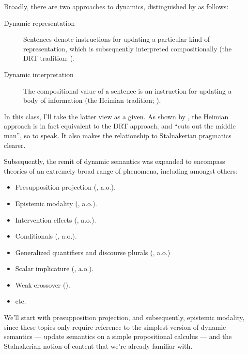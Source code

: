 \documentclass[nols,twoside,nofonts,nobib,nohyper]{tufte-handout}
\theoremstyle{definition}
\begin{document}
Broadly, there are two approaches to dynamics, distinguished by \citet{Yalcin2013} as follows:

\begin{description}

    \item[Dynamic representation] Sentences denote instructions for updating a particular kind of representation, which is subsequently interpreted compositionally (the DRT tradition; \citealt{Kamp1981}).

    \item[Dynamic interpretation] The compositional value of a sentence is an instruction for updating a body of information (the Heimian tradition; \citealt{Heim1982}).

\end{description}

In this class, I'll take the latter view as a given. As shown by \citet{GroenendijkStokhof1991}, the Heimian approach is in fact equivalent to the DRT approach, and \enquote{cuts out the middle man}, so to speak. It also makes the relationship to Stalnakerian pragmatics clearer.

Subsequently, the remit of dynamic semantics was expanded to encompass theories of an extremely broad range of phenomena, including amongst others:

\begin{itemize}

  \item Presupposition projection (\citealt{Heim1983,Beaver2001}, a.o.).
  \item Epistemic modality (\citealt{Veltman1996,GroenendijkEtAl1996}, a.o.).
  \item Intervention effects (\citealt{Honcoop1998}, a.o.).
  \item Conditionals (\citealt{Gillies2004}, a.o.).
  \item Generalized quantifiers and discourse plurals (\citealt{vandenBerg1996}, a.o.)
  \item Scalar implicature (\citealt{Sudo2019}, a.o.).
  \item Weak crossover (\citealt{Chierchia2020,Elliott2020b}).
  \item etc.

\end{itemize}

We'll start with presupposition projection, and subsequently, epistemic modality, since these topics only require reference to the simplest version of dynamic semantics --- update semantics on a simple propositional calculus --- and the Stalnakerian notion of content that we're already familiar with.
\end{document}
